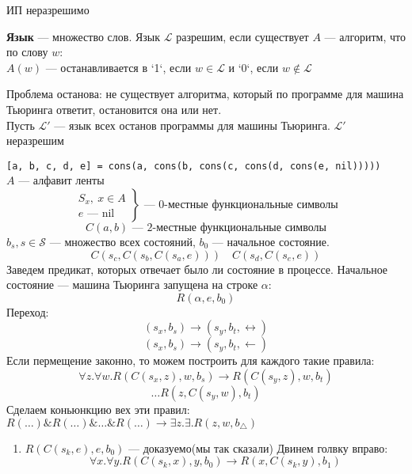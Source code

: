 \documentclass[english]{article}
\begin{document}
\begin{theorem}
	ИП неразрешимо
	\label{org694628a}
\end{theorem}
\begin{definition}
	\textbf{Язык} --- множество слов. Язык \(\mathcal{L}\) разрешим, если существует \(A\) --- алгоритм, что по слову \(w\): \\
	\(A(w)\) --- останавливается в `1`, если \(w \in \mathcal{L}\) и `0`, если \(w \not\in \mathcal{L}\)
	\label{org5406416}
\end{definition}
\begin{remark}
	Проблема останова: не существует алгоритма, который по программе для машина Тьюринга ответит, остановится она или нет. \\
	Пусть \(\mathcal{L}'\) --- язык всех останов программы для машины Тьюринга. \(\mathcal{L}'\) неразрешим
	\label{orgc6017e1}
\end{remark}
\begin{remark}
	\texttt{[a, b, c, d, e] = cons(a, cons(b, cons(c, cons(d, cons(e, nil)))))} \\
	\(A\) --- алфавит ленты
	\[ \left.\begin{array}{l}
			S_x,\ x \in A \\
			e \text{ --- } \text{nil}
		\end{array}\right\} \text{ --- } 0\text{-местные функциональные символы}\]
	\[ C(a, b) \text{ --- } 2\text{-местные функциональные символы} \]
	\(b_s, s \in \mathcal{S}\) --- множество всех состояний, \(b_0\) --- начальное состояние.
	\[ C(s_c, C(s_b, C(s_a, e))) \quad C(s_d, C(s_e, e)) \]
	Заведем предикат, которых отвечает было ли состояние в процессе. Начальное состояние --- машина Тьюринга запущена на строке \(\alpha\):
	\[ R(\alpha, e, b_0) \]
	Переход:
	\[ (s_x, b_s) \to (s_y, b_t, \leftrightarrow) \]
	\[ (s_x, b_s) \to (s_y, b_t, \leftarrow) \]
	Если пермещение законно, то можем построить для каждого такие правила:
	\[ \forall z. \forall w. R(C(s_x, z), w, b_s) \to R(C(s_y, z), w, b_t) \]
	\[ \dots  R(z, C(s_y, w), b_t)\]
	Сделаем коньюнкцию вех эти правил: \(R(\dots)\&R(\dots)\&\dots\&R(\dots) \to \exists z. \exists . R(z, w, b_\triangle)\)
	\fixme
\end{remark}
\begin{examp}
	\-
	\begin{enumerate}
		\item \(R(C(s_k, e), e, b_0)\) --- доказуемо(мы так сказали)
		      Двинем голвку вправо:
		      \[ \forall x. \forall y. R(C(s_k, x), y, b_0) \to R(x, C(s_k, y), b_1) \]
	\end{enumerate}
\end{examp}
\end{document}
